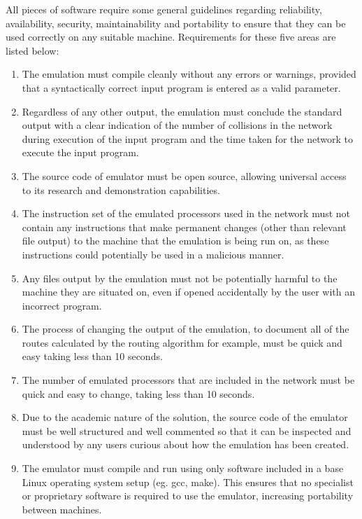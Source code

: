 \documentclass[a4paper, 12pt]{article}
\begin{document}
All pieces of software require some general guidelines regarding reliability, availability, security, maintainability and portability to ensure that they can be used correctly on any suitable machine. Requirements for these five areas are listed below:
\begin{enumerate}[leftmargin=*,labelindent=15pt,label=\bfseries 4.\arabic*]
	\item The emulation must compile cleanly without any errors or warnings, provided that a syntactically correct input program is entered as a valid parameter.
	\item Regardless of any other output, the emulation must conclude the standard output with a clear indication of the number of collisions in the network during execution of the input program and the time taken for the network to execute the input program.
	\item The source code of emulator must be open source, allowing universal access to its research and demonstration capabilities.
	\item The instruction set of the emulated processors used in the network must not contain any instructions that make permanent changes (other than relevant file output) to the machine that the emulation is being run on, as these instructions could potentially be used in a malicious manner.
	\item Any files output by the emulation must not be potentially harmful to the machine they are situated on, even if opened accidentally by the user with an incorrect program.
	\item The process of changing the output of the emulation, to document all of the routes calculated by the routing algorithm for example, must be quick and easy taking less than 10 seconds.
	\item The number of emulated processors that are included in the network must be quick and easy to change, taking less than 10 seconds.
	\item Due to the academic nature of the solution, the source code of the emulator must be well structured and well commented so that it can be inspected and understood by any users curious about how the emulation has been created.
	\item The emulator must compile and run using only software included in a base Linux operating system setup (eg. gcc, make). This ensures that no specialist or proprietary software is required to use the emulator, increasing portability between machines.
\end{enumerate}
\end{document}
